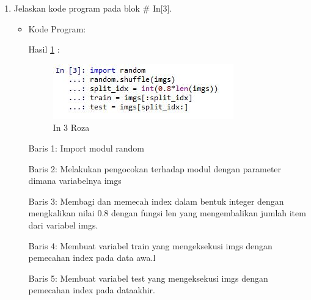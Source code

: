 \begin{enumerate}
\item Jelaskan kode program pada blok \# In[3].
\begin{itemize}
\item Kode Program:

\par Hasil \ref{in3roza} :
\begin{figure}[!hbtp]
\centering
\includegraphics[scale=0.7]{figures/prak3roza.jpg}
\caption{In 3 Roza}
\label{in3roza}
\end{figure}
\par Baris 1: Import modul random
\par Baris 2: Melakukan pengocokan terhadap modul dengan parameter dimana variabelnya imgs
\par Baris 3: Membagi dan memecah index dalam bentuk integer dengan mengkalikan nilai 0.8 dengan fungsi len yang mengembalikan jumlah item dari variabel imgs.
\par Baris 4: Membuat variabel train yang mengeksekusi imgs dengan pemecahan index pada data awa.l
\par Baris 5: Membuat variabel test yang mengeksekusi imgs dengan pemecahan index pada dataakhir.

\end{itemize}
\par


\end{enumerate}
